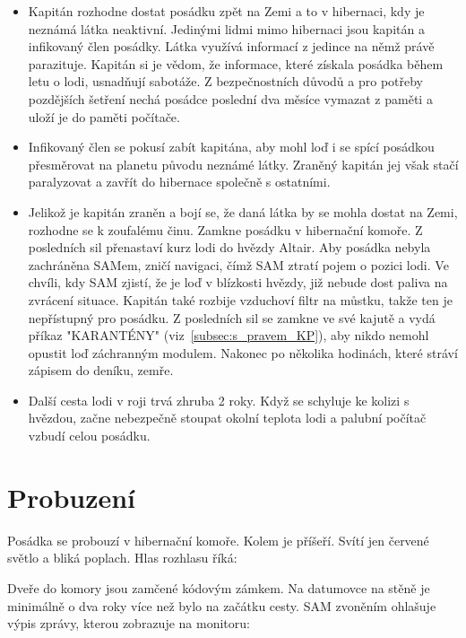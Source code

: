 \documentclass[11pt,oneside,a4paper]{article}
\begin{document}
\begin{itemize}
\item Kapitán rozhodne dostat posádku zpět na Zemi a to v hibernaci, kdy je neznámá látka neaktivní. Jedinými lidmi mimo hibernaci jsou kapitán a infikovaný člen posádky. Látka využívá informací z jedince na němž právě parazituje. Kapitán si je vědom, že informace, které získala posádka během letu o lodi, usnadňují sabotáže. Z bezpečnostních důvodů a pro potřeby pozdějších šetření nechá posádce poslední dva měsíce vymazat z paměti a uloží je do paměti počítače.
\item Infikovaný člen se pokusí zabít kapitána, aby mohl loď i se spící posádkou přesměrovat na planetu původu neznámé látky. Zraněný kapitán jej však stačí paralyzovat a zavřít do hibernace společně s ostatními.
\item Jelikož je kapitán zraněn a bojí se, že daná látka by se mohla dostat na Zemi, rozhodne se k zoufalému činu. Zamkne posádku v hibernační komoře. Z posledních sil přenastaví kurz lodi do hvězdy Altair. Aby posádka nebyla zachráněna SAMem, zničí navigaci, čímž SAM ztratí pojem o pozici lodi. Ve chvíli, kdy SAM zjistí, že je loď v blízkosti hvězdy, již nebude dost paliva na zvrácení situace. Kapitán také rozbije vzduchoví filtr na můstku, takže ten je nepřístupný pro posádku. Z posledních sil se zamkne ve své kajutě a vydá příkaz "KARANTÉNY" (viz~\ref{subsec:s_pravem_KP}), aby nikdo nemohl opustit loď záchranným modulem. Nakonec po několika hodinách, které stráví zápisem do deníku, zemře.
\item Další cesta lodi v roji trvá zhruba 2 roky. Když se schyluje ke kolizi s hvězdou, začne nebezpečně stoupat okolní teplota lodi a palubní počítač vzbudí celou posádku.

\end{itemize}

\section{\texorpdfstring{Probuzení}{Probuzeni}}
\label{sec:probuzeni}
Posádka se probouzí v hibernační komoře. Kolem je příšeří. Svítí jen červené světlo a bliká poplach. Hlas rozhlasu říká: 

\begin{quote}
\end{quote}

Dveře do komory jsou zamčené kódovým zámkem. Na datumovce na stěně je minimálně o dva roky více než bylo na začátku cesty. SAM zvoněním ohlašuje výpis zprávy, kterou zobrazuje na monitoru:
\end{document}
